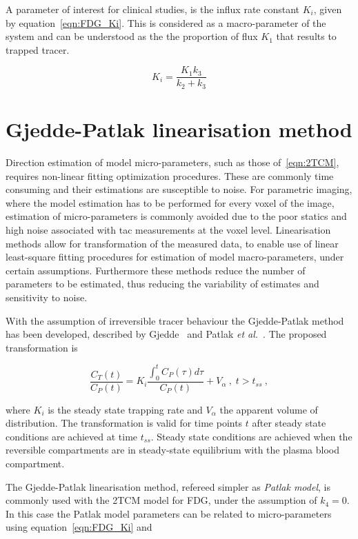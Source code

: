 A parameter of interest for clinical studies, is the influx rate constant $K_i$, given by equation~\ref{eqn:FDG_Ki}. This is considered as a macro-parameter of the system and can be understood as the the proportion of flux $K_1$ that results to trapped tracer. 

\begin{equation}
K_i = \frac{K_1 k_3}{k_2+k_3}
\label{eqn:FDG_Ki}
\end{equation}


\section{Gjedde-Patlak linearisation method}

Direction estimation of model micro-parameters, such as those of~\ref{eqn:2TCM}, requires non-linear fitting optimization procedures. These are commonly time consuming and their estimations are susceptible to noise.
For parametric imaging, where the model estimation has to be performed for every voxel of the image, estimation of micro-parameters is commonly avoided due to the poor statics and high noise associated with \gls{tac} measurements at the voxel level. 
Linearisation methods allow for transformation of the measured data, to enable use of linear least-square fitting procedures for estimation of model macro-parameters, under certain assumptions. Furthermore these methods reduce the number of parameters to be estimated, thus reducing the variability of estimates and sensitivity to noise. 

With the assumption of irreversible tracer behaviour the Gjedde-Patlak method has been developed, described by Gjedde~\cite{Gjedde1982} and Patlak \textit{et al.}~\cite{Patlak1985}. The proposed transformation is

\begin{equation}
\label{eqn:PatlakModel}
\frac{C_{T}(t)}{C_{P}(t)} = K_i \frac{\int_{0}^{t} C_{P}(\tau) d\tau}{ C_{P}(t)} + V_{\alpha}   \ , \;  t>t_{ss} \ ,
\end{equation}

where $K_i$ is the steady state trapping rate and $V_{\alpha}$ the apparent volume of distribution. The transformation is valid for time points $t$ after steady state conditions are achieved at time $t_{ss}$. Steady state conditions are achieved when the reversible compartments are in steady-state equilibrium with the plasma blood compartment. 

The Gjedde-Patlak linearisation method, refereed simpler as \textit{Patlak model}, is commonly used with the 2TCM model for FDG, under the assumption of $k_4=0$. In this case the Patlak model parameters can be related to micro-parameters using equation~\ref{eqn:FDG_Ki} and 

